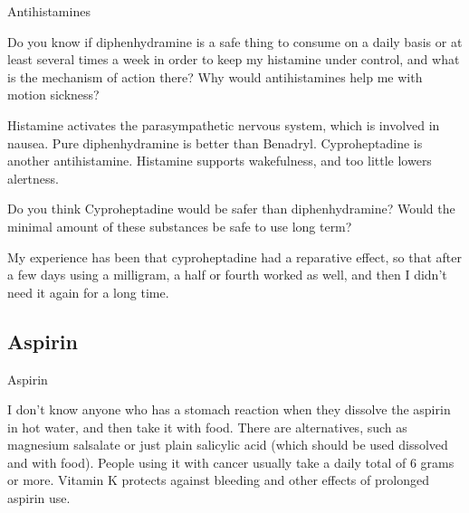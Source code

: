 \documentclass[11pt,oneside,openany,extrafontsizes]{memoir}
\begin{document}
\begin{emailexchange}{Antihistamines}

    \begin{question}
        Do you know if diphenhydramine is a safe thing to consume on a daily basis or at least several times a week in order to keep my histamine under control, and what is the mechanism of action there? Why would antihistamines help me with motion sickness?
    \end{question}

    \begin{answer}
      Histamine activates the parasympathetic nervous system, which is involved in nausea. Pure diphenhydramine is better than Benadryl. Cyproheptadine is another antihistamine. Histamine supports wakefulness, and too little lowers alertness.
    \end{answer}
	
    \begin{question}
        Do you think Cyproheptadine would be safer than diphenhydramine? Would the minimal amount of these substances be safe to use long term?
    \end{question}

    \begin{answer}
      My experience has been that cyproheptadine had a reparative effect, so that after a few days using a milligram, a half or fourth worked as well, and then I didn't need it again for a long time.
    \end{answer}
\end{emailexchange}

\subsection{Aspirin}

\begin{standalonequote}{Aspirin}

    \begin{answer}
        I don't know anyone who has a stomach reaction when they dissolve the aspirin in hot water, and then take it with food. There are alternatives, such as magnesium salsalate or just plain salicylic acid (which should be used dissolved and with food). People using it with cancer usually take a daily total of 6 grams or more. Vitamin K protects against bleeding and other effects of prolonged aspirin use.
    \end{answer}
\end{standalonequote}
\end{document}

